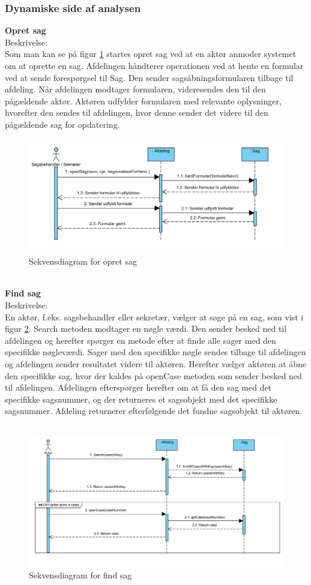 \subsubsection{Dynamiske side af analysen}
\textbf{Opret sag}\\
Beskrivelse:\\
Som man kan se på figur \ref{fig:opretSag} startes opret sag ved at en aktør anmoder systemet om at oprette en sag. 
Afdelingen håndterer operationen ved at hente en formular ved at sende forespørgsel til Sag. 
Den sender sagsåbningsformularen tilbage til afdeling. Når afdelingen modtager formularen, videresendes den til den pågældende aktør. Aktøren udfylder formularen med relevante oplysninger, hvorefter den sendes til afdelingen, hvor denne sender det videre til den pågældende sag for opdatering. \\
\begin{figure}[htb!]
  \includegraphics[width=\linewidth]{./PNG/analyse/opretSag.PNG} 
  \caption{Sekvensdiagram for opret sag}
  \label{fig:opretSag}
\end{figure}\\
\textbf{Find sag} \label{af:findSag}\\
Beskrivelse: \\
En aktør, f.eks. sagsbehandler eller sekretær, vælger at søge på en sag, som vist i figur \ref{fig:findSag}. Search metoden modtager en nøgle værdi. Den sender besked ned til afdelingen og herefter spørger en metode efter at finde alle sager med den specifikke nøgleværdi. Sager med den specifikke nøgle sendes tilbage til afdelingen og afdelingen sender resultatet videre til aktøren. Herefter vælger aktøren at åbne den specifikke sag, hvor der kaldes på openCase metoden som sender besked ned til afdelingen. Afdelingen efterspørger herefter om at få den sag med det specifikke sagsnummer, og der returneres et sagsobjekt med det specifikke sagsnummer. Afdeling returnerer efterfølgende det fundne sagsobjekt til aktøren. \\ \\
\begin{figure}[htb!]
  \includegraphics[width=\linewidth]{./PNG/analyse/findSag.PNG} 
  \caption{Sekvensdiagram for find sag}
  \label{fig:findSag}
\end{figure}